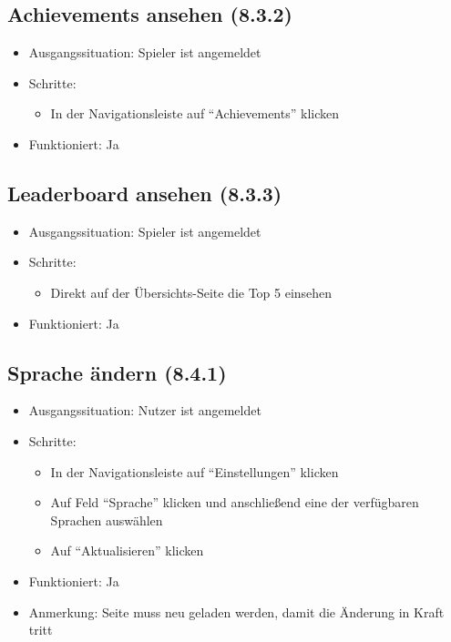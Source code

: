 \documentclass[a4paper]{scrreprt}
\begin{document}
            \subsection{Achievements ansehen (8.3.2)}
            \begin{itemize}
                \item Ausgangssituation: Spieler ist angemeldet
                \item Schritte:
                    \begin{itemize}
                        \item In der Navigationsleiste auf \enquote{Achievements} klicken
                    \end{itemize}
                \item Funktioniert: Ja
            \end{itemize}

            \subsection{Leaderboard ansehen (8.3.3)}
            \begin{itemize}
                \item Ausgangssituation: Spieler ist angemeldet
                \item Schritte:
                    \begin{itemize}
                        \item Direkt auf der Übersichts-Seite die Top 5 einsehen
                    \end{itemize}
                \item Funktioniert: Ja
            \end{itemize}

            \subsection{Sprache ändern (8.4.1)}
            \begin{itemize}
                \item Ausgangssituation: Nutzer ist angemeldet
                \item Schritte:
                    \begin{itemize}
                        \item In der Navigationsleiste auf \enquote{Einstellungen} klicken
                        \item Auf Feld \enquote{Sprache} klicken und anschließend eine der verfügbaren Sprachen auswählen
                        \item Auf \enquote{Aktualisieren} klicken
                    \end{itemize}
                \item Funktioniert: Ja
                \item Anmerkung: Seite muss neu geladen werden, damit die Änderung in Kraft tritt
            \end{itemize}
\end{document}
